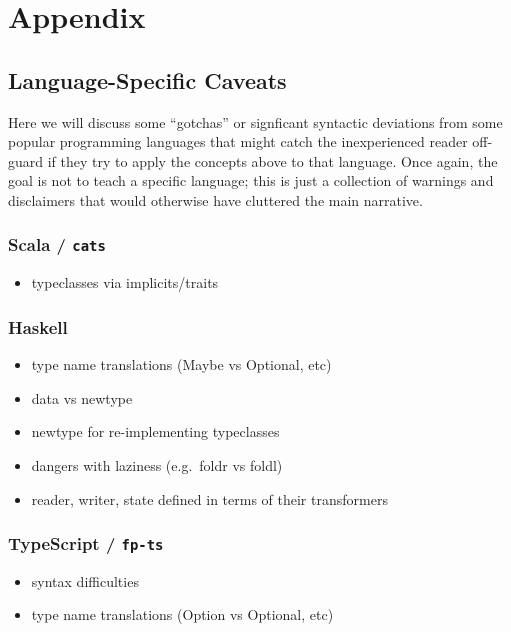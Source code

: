 
\chapter{Appendix}

\section{Language-Specific Caveats}\label{lang}

Here we will discuss some ``gotchas'' or signficant syntactic deviations from some popular programming languages that might catch the inexperienced reader off-guard if they try to apply the concepts above to that language. Once again, the goal is not to teach a specific language; this is just a collection of warnings and disclaimers that would otherwise have cluttered the main narrative.

\subsection{Scala / \texttt{cats}}\label{lang:scala}

\begin{itemize}
    \item typeclasses via implicits/traits
\end{itemize}

\subsection{Haskell}\label{lang:haskell}

\begin{itemize}
    \item type name translations (Maybe vs Optional, etc)
    \item data vs newtype
    \item newtype for re-implementing typeclasses
    \item dangers with laziness (e.g.\ foldr vs foldl)
    \item reader, writer, state defined in terms of their transformers
\end{itemize}

\subsection{TypeScript / \texttt{fp-ts}}\label{lang:fp-ts}

\begin{itemize}
    \item syntax difficulties
    \item type name translations (Option vs Optional, etc)
\end{itemize}

